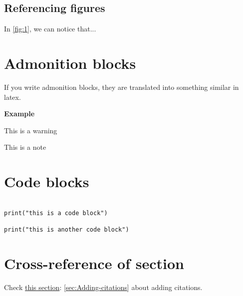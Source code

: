 \documentclass{article}
\begin{document}






\subsection{Referencing figures}

In \cref{fig:1}, we can notice that...





\section{Admonition blocks}

If you write admonition blocks, they are translated into something similar in latex.

\textbf{Example}

\begin{tcolorbox}[width=\textwidth,colback={red},title={warning},outer arc=0mm,colupper=white]

This is a warning

\end{tcolorbox}



\begin{tcolorbox}[width=\textwidth,colback={white},title={note},outer arc=0mm,colupper=black]

This is a note

\end{tcolorbox}





\section{Code blocks}

\begin{verbatim}

print("this is a code block")

print("this is another code block")

\end{verbatim}



\section{Cross-reference of section}

Check \hyperref[sec:Adding-citations]{this section}: \autoref{sec:Adding-citations} about adding citations.
\end{document}
